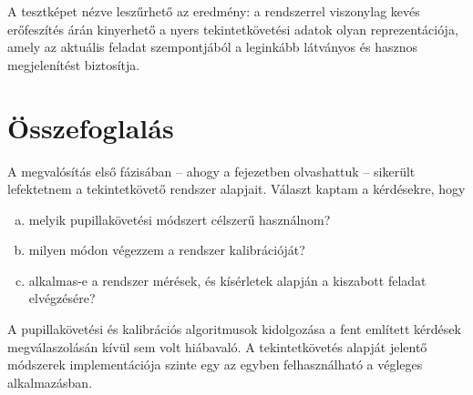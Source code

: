 \bigskip

A tesztképet nézve leszűrhető az eredmény: a rendszerrel viszonylag kevés erőfeszítés árán kinyerhető a nyers tekintetkövetési adatok olyan reprezentációja, amely az aktuális feladat szempontjából a leginkább látványos és hasznos megjelenítést biztosítja.

\section{Összefoglalás}\label{sect:kiserlet_osszefoglalas}

A megvalósítás első fázisában -- ahogy a fejezetben olvashattuk -- sikerült lefektetnem a tekintetkövető rendszer alapjait. Választ kaptam a kérdésekre, hogy

\begin{enumerate}[a)]
 \item melyik pupillakövetési módszert célszerű használnom?
 \item milyen módon végezzem a rendszer kalibrációját?
 \item alkalmas-e a rendszer mérések, és kísérletek alapján a kiszabott feladat elvégzésére?
\end{enumerate} 

A pupillakövetési és kalibrációs algoritmusok kidolgozása a fent említett kérdések megválaszolásán kívül sem volt hiábavaló. A tekintetkövetés alapját jelentő módszerek implementációja szinte egy az egyben felhasználható a végleges alkalmazásban.